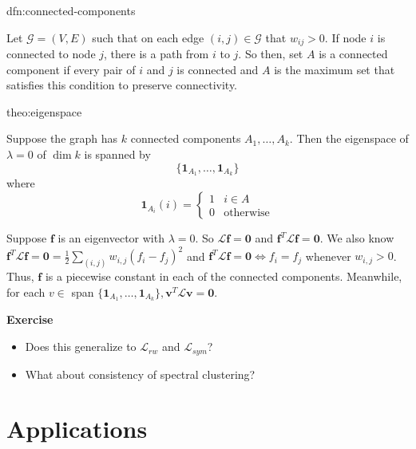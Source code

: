 \documentclass[12pt]{article}
\theoremstyle{plain}
\begin{document}
\begin{dfn}{dfn:connected-components}

Let $ \mathcal{G} = (V, E) $ such that on each edge $ (i, j) \in \mathcal{G} $ that $ w_{ij} > 0 $.
If node $ i $ is connected to node $ j $, there is a path from $ i $ to $ j $.
So then, set $ A $ is a connected component if every pair of $ i $ and $ j $ is connected and $ A $ is the maximum set that satisfies this condition to preserve connectivity.

\end{dfn}

\begin{theo}[Eigenspace of $ \lambda = 0 $ of $\mathcal{L}$]{theo:eigenspace}

Suppose the graph has $ k $ connected components $ A_{1}, \ldots, A_{k} $.
Then the eigenspace of $ \lambda = 0 $ of $ \dim{k} $ is spanned by
\[
\{ \mathbf{1}_{A_{1}}, \ldots, \mathbf{1}_{A_{k}} \}
\]
where
\[
\mathbf{1}_{A_{i}} (i) =
\begin{cases}
  1 & i \in A \\
  0 & \text{otherwise}
\end{cases}
\]

\end{theo}

\begin{prf}[Eigenspace of $ \lambda = 0 $ of $\mathcal{L}$, Theorem~\ref{theo:eigenspace}]
	Suppose $\mathbf{f}$ is an eigenvector with  $\lambda = 0$.
  So $\mathcal{L}\textbf{f} = \textbf{0}$ and $\textbf{f}^T\mathcal{L}\textbf{f} = \textbf{0}$.
  We also know $\textbf{f}^T\mathcal{L}\textbf{f} = \textbf{0} = \frac{1}{2} \sum_{(i,j)}w_{i,j}(f_i-f_j)^2$ and $\textbf{f}^T\mathcal{L}\textbf{f} = \textbf{0} \Leftrightarrow f_i=f_j$ whenever $w_{i,j} > 0$.
  Thus, $\textbf{f}$ is a piecewise constant in each of the connected components.
  Meanwhile, for each $v \in$ span $\{\mathbf{1}_{A_{1}}, \ldots, \mathbf{1}_{A_{k}} \}, \mathbf{v}^T \mathcal{L} \mathbf{v} = \mathbf{0}$.
\end{prf}
\textbf{Exercise}
\begin{itemize}
	\item Does this generalize to $\mathcal{L}_{rw}$ and $\mathcal{L}_{sym}$?
	\item What about consistency of spectral clustering?
\end{itemize}

\section{Applications}
\end{document}

